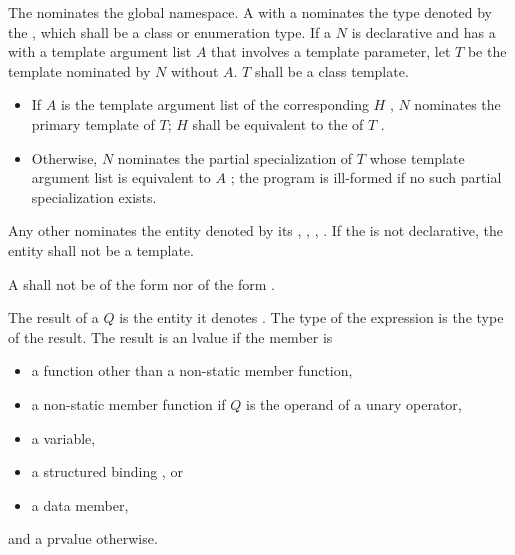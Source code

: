 \documentclass{wg21}
\begin{document}
\pnum
The  \tcode{::} nominates
the global namespace.
A  with a 
nominates the type denoted by the ,
which shall be a class or enumeration type.
If a  $N$
is declarative and
has a  with a template argument list $A$
that involves a template parameter,
let $T$ be the template nominated by $N$ without $A$.
$T$ shall be a class template.
\begin{itemize}
    \item
    {If $A$ is the template argument list  of
    the corresponding  $H$ ,
    $N$ nominates the primary template of $T$;
    $H$ shall be equivalent to
    the  of $T$ .}
    \item
    {Otherwise, $N$ nominates the partial specialization  of $T$
    whose template argument list is equivalent to $A$ ;
    the program is ill-formed if no such partial specialization exists.}
\end{itemize}
Any other  nominates
the entity denoted by its
,
,
, 
.
If the  is not declarative,
the entity shall not be a template.

\pnum
A  shall not be of the form
  \tcode{\~}
 nor of the form
 \tcode{::} \tcode{\~} .

\pnum
The result of a  $Q$ is
the entity it denotes .
The type of the expression is the type of the result.
The result is an lvalue if the member is
\begin{itemize}
    \item
    a function other than a non-static member function,
    \item
    a non-static member function
    if $Q$ is the operand of a unary \tcode{\&} operator,
    \item
    a variable,
    \item
    a structured binding , or
    \item
    a data member,
\end{itemize}
and a prvalue otherwise.
\end{document}
